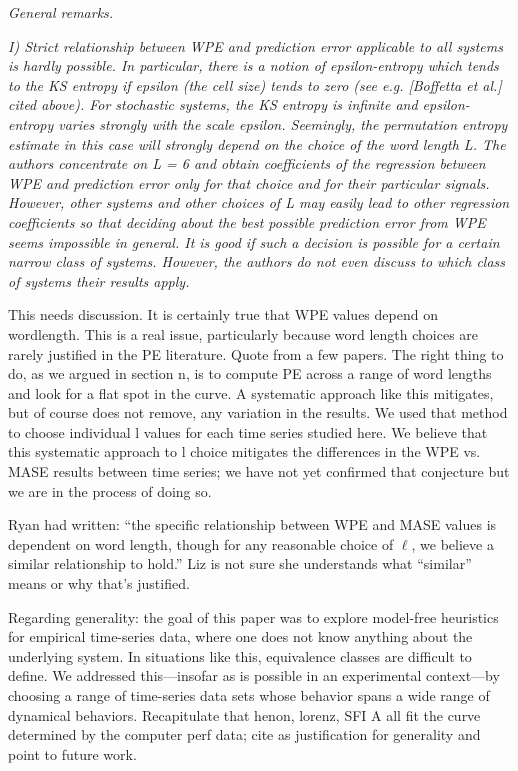 \documentclass[12pt]{article}
\newcommand{\alert}[1]{{\color{red}#1}}
\begin{document}
\noindent\emph{General remarks.}

\emph{I) Strict relationship between WPE and prediction error
  applicable to all systems is hardly possible. In particular, there
  is a notion of epsilon-entropy which tends to the KS entropy if
  epsilon (the cell size) tends to zero (see e.g.  [Boffetta et al.]
  cited above). For stochastic systems, the KS entropy is infinite and
  epsilon-entropy varies strongly with the scale epsilon. Seemingly,
  the permutation entropy estimate in this case will strongly depend
  on the choice of the word length L. The authors concentrate on L = 6
  and obtain coefficients of the regression between WPE and prediction
  error only for that choice and for their particular
  signals. However, other systems and other choices of L may easily
  lead to other regression coefficients so that deciding about the
  best possible prediction error from WPE seems impossible in
  general. It is good if such a decision is possible for a certain
  narrow class of systems. However, the authors do not even discuss to
  which class of systems their results apply.}

\alert{This needs discussion.  It is certainly true that WPE values
  depend on wordlength.  This is a real issue, particularly because
  word length choices are rarely justified in the PE literature.
  Quote from a few papers.  The right thing to do, as we argued in
  section n, is to compute PE across a range of word lengths and look
  for a flat spot in the curve.  A systematic approach like this
  mitigates, but of course does not remove, any variation in the
  results.  We used that method to choose individual l values for each
  time series studied here.  We believe that this systematic approach
  to l choice mitigates the differences in the WPE vs. MASE results
  between time series; we have not yet confirmed that conjecture but
  we are in the process of doing so.

Ryan had written: ``the specific relationship between WPE and MASE
values is dependent on word length, though for any reasonable choice
of $\ell$, we believe a similar relationship to hold.'' Liz is not
sure she understands what ``similar'' means or why that's justified.}

Regarding generality: the goal of this paper was to explore model-free
heuristics for empirical time-series data, where one does not know
anything about the underlying system.  In situations like this,
equivalence classes are difficult to define.  We addressed
this---insofar as is possible in an experimental context---by choosing
a range of time-series data sets whose behavior spans a wide range of
dynamical behaviors.  Recapitulate that henon, lorenz, SFI A all fit
the curve determined by the computer perf data; cite as justification
for generality and point to future work.
\end{document}
